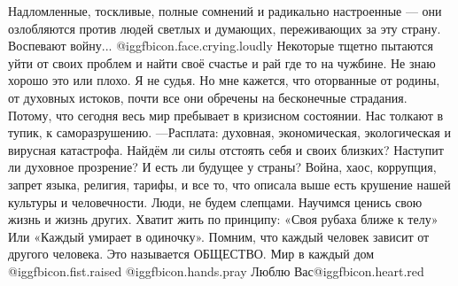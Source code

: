 
\obeycr
 Надломленные, тоскливые, полные сомнений  и радикально настроенные — они озлобляются  против людей  светлых и думающих, переживающих за  эту страну.  Воспевают войну... @igg{fbicon.face.crying.loudly} 
Некоторые тщетно пытаются уйти от своих проблем и найти своё счастье и рай где то на чужбине. Не знаю хорошо это или плохо. 
Я не судья. Но мне кажется, что оторванные от родины, от духовных истоков, почти все они обречены на бесконечные страдания.
Потому, что сегодня  весь мир пребывает в кризисном состоянии. 
Нас толкают в тупик, к саморазрушению. 
—Расплата: духовная, экономическая, экологическая и вирусная катастрофа.
Найдём ли силы отстоять себя и своих близких? 
Наступит ли духовное прозрение? И есть ли будущее у  страны?
 Война, хаос, коррупция, запрет языка, религия, тарифы, и  все то, что описала выше есть крушение нашей культуры и человечности.
Люди, не будем слепцами. Научимся ценись свою жизнь и жизнь других. Хватит  жить по принципу: «Своя рубаха ближе к телу»
Или «Каждый умирает в одиночку». Помним, что каждый человек зависит от другого человека.
Это называется ОБЩЕСТВО. Мир в каждый дом @igg{fbicon.fist.raised}  @igg{fbicon.hands.pray} Люблю Вас@igg{fbicon.heart.red}
\restorecr

